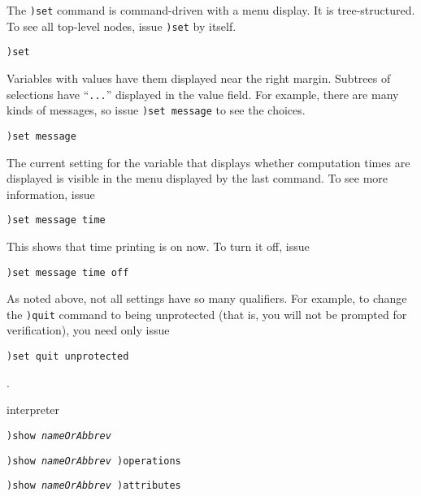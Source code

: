 {{{{{{{The {\tt )set} command is command-driven with a menu display.
It is tree-structured.
To see all top-level nodes, issue {\tt )set} by itself.
\begin{verbatim}
)set
\end{verbatim}
Variables with values have them displayed near the right margin.
Subtrees of selections have ``{\tt ...}''
displayed in the value field.
For example, there are many kinds of messages, so issue
{\tt )set message} to see the choices.
\begin{verbatim}
)set message
\end{verbatim}
The current setting  for the variable that displays
whether computation times
are displayed is visible in the menu displayed by the last command.
To see more information, issue
\begin{verbatim}
)set message time
\end{verbatim}
This shows that time printing is on now.
To turn it off, issue
\begin{verbatim}
)set message time off
\end{verbatim}

As noted above, not all settings have so many qualifiers.
For example, to change the {\tt )quit} command to being unprotected
(that is, you will not be prompted for verification), you need only issue
\begin{verbatim}
)set quit unprotected
\end{verbatim}

\par{}
.




\par{} interpreter

\par{}
\begin{simpleList}
\item{\tt )show {\it nameOrAbbrev}}
\item{\tt )show {\it nameOrAbbrev} )operations}
\item{\tt )show {\it nameOrAbbrev} )attributes}
\end{simpleList}

}}}}}}}
